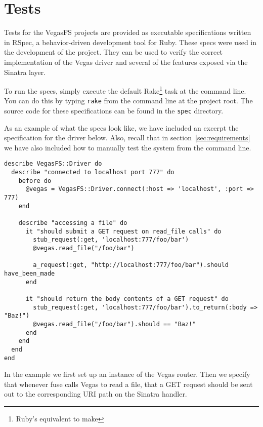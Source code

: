 \section{Tests}

Tests for the VegasFS projects are provided as executable specifications written in
RSpec, a behavior-driven development tool for Ruby. These specs were used in
the development of the project. They can be used to verify the correct
implementation of the Vegas driver and several of the features exposed via the
Sinatra layer.

To run the specs, simply execute the default Rake\footnote{Ruby's equivalent to
make} task at the command line. You can do this by typing \texttt{rake} from the
command line at the project root. The source code for these specifications can
be found in the \texttt{spec} directory.

As an example of what the specs look like, we have included an excerpt the
specification for the driver below. Also, recall that in
section~\ref{sec:requirements} we have also included how to manually test the
system from the command line.

\begin{verbatim}
describe VegasFS::Driver do
  describe "connected to localhost port 777" do
    before do
      @vegas = VegasFS::Driver.connect(:host => 'localhost', :port => 777)
    end

    describe "accessing a file" do
      it "should submit a GET request on read_file calls" do
        stub_request(:get, 'localhost:777/foo/bar')
        @vegas.read_file("/foo/bar")

        a_request(:get, "http://localhost:777/foo/bar").should have_been_made
      end

      it "should return the body contents of a GET request" do
        stub_request(:get, 'localhost:777/foo/bar').to_return(:body => "Baz!")
        @vegas.read_file("/foo/bar").should == "Baz!"
      end
    end
  end
end
\end{verbatim}

In the example we first set up an instance of the Vegas router. Then we specify
that whenever fuse calls Vegas to read a file, that a GET request should be sent
out to the corresponding URI path on the Sinatra handler.

